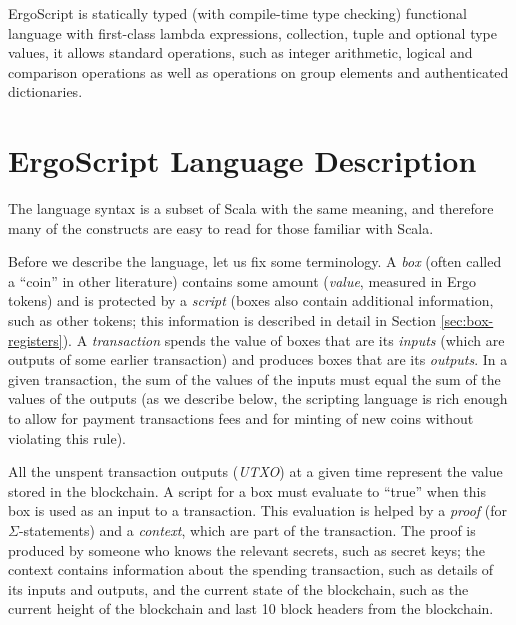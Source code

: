 \documentclass[11pt]{article}
\newcommand{\authnote}[2]{\marginpar{\parbox{\marginparwidth}{\tiny %
  \textsf{#1 {\textcolor{blue}{notes: #2}}}}}%
  \textcolor{blue}{\textbf{\dag}}}
\newcommand{\authnote}[2]{
  \textsf{#1 \textcolor{blue}{: #2}}}
\newcommand{\authnote}[2]{}
\newcommand{\lnote}[1]{{\authnote{\textcolor{orange}{Leo notes}}{#1}}}
\newcommand{\ignore}[1]{}
\newcommand{\langname}{ErgoScript\xspace}
\begin{document}
\langname is statically typed (with compile-time type checking) functional
language with first-class lambda expressions, collection, tuple and optional
type values, it allows standard operations, such as integer arithmetic,
logical and comparison operations as well as operations on group elements and authenticated dictionaries.

\ignore{
    \paragraph{Running time estimation and safety checks}
    \lnote{someone should fill this in, because I know very little about it}
    See Section \ref{sec:safety} for more details.
}


\section{\langname Language Description}

The language syntax is a subset of Scala with the same meaning, and therefore many of the constructs are easy to read for those familiar with Scala.

Before we describe the language, let us fix some terminology. A \emph{box} (often called a ``coin'' in other literature) contains some amount (\emph{value}, measured in Ergo tokens) and is protected by a \emph{script} (boxes also contain additional information, such as other tokens; this information is described in detail in Section \ref{sec:box-registers}). A \emph{transaction} spends the value of boxes that are its \emph{inputs} (which are outputs of some earlier transaction) and produces boxes that are its \emph{outputs}. In a given transaction, the sum of the values of the inputs must equal the sum of the values of the outputs (as we describe below, the scripting language is rich enough to allow for payment transactions fees and for minting of new coins without violating this rule).


All the unspent transaction outputs (\emph{UTXO}) at a given time represent the value stored in the blockchain. A script for a box must evaluate to ``true'' when this box is used as an input to a transaction. This evaluation is helped by a \emph{proof} (for $\Sigma$-statements) and a \emph{context}, which are part of the transaction. The proof is produced by someone who knows the relevant secrets, such as secret keys; the context contains information about the spending transaction, such as details of its inputs and outputs, and the current state of the blockchain, such as the current height of the blockchain and last 10 block headers from the blockchain.
\end{document}
